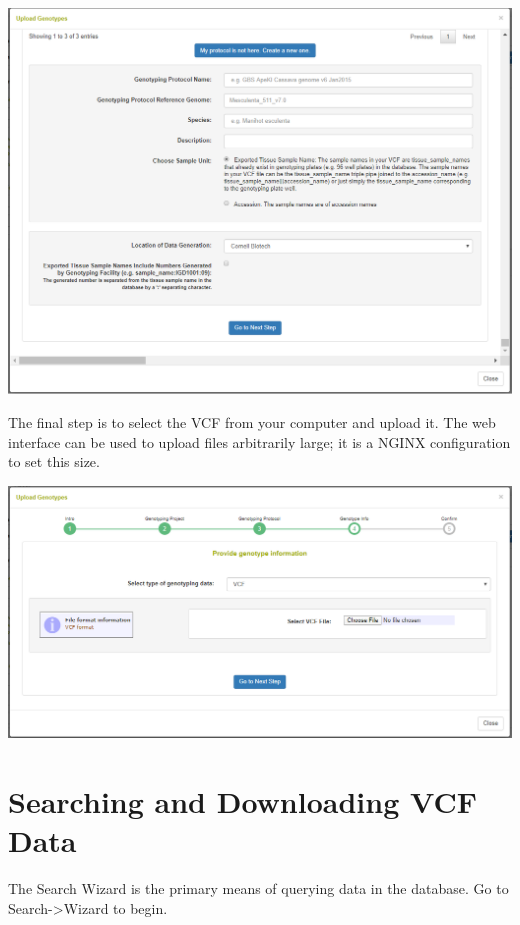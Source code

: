 \documentclass[
  12pt,
]{book}
\begin{document}
\begin{center}\includegraphics[width=0.95\linewidth]{assets/images/manage_genotyping_data_upload_dialog_protocol} \end{center}

The final step is to select the VCF from your computer and upload it. The web interface can be used to upload files arbitrarily large; it is a NGINX configuration to set this size.

\begin{center}\includegraphics[width=0.95\linewidth]{assets/images/manage_genotyping_data_upload_dialog_vcf} \end{center}

\hypertarget{searching-and-downloading-vcf-data}{%
\section{Searching and Downloading VCF Data}\label{searching-and-downloading-vcf-data}}

The Search Wizard is the primary means of querying data in the database. Go to Search-\textgreater Wizard to begin.
\end{document}
